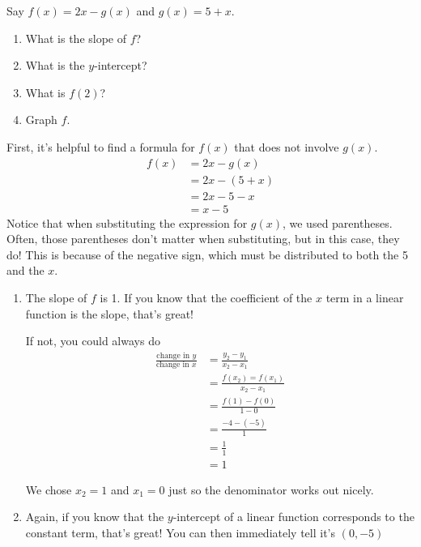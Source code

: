 \documentclass[noauthor]{ximera}
\begin{document}
\begin{problem}
Say \(f(x) = 2x - g(x)\) and \(g(x) = 5 + x\).

\begin{enumerate}
    \item What is the slope of \(f\)?
    \item What is the \(y\)-intercept?
    \item What is \(f(2)\)?
    \item Graph \(f\).
\end{enumerate}

\begin{explanation}
    First, it's helpful to find a formula for \(f(x)\) that does not involve \(g(x)\). 
    \begin{align*}
        f(x) & = 2x - g(x) \\
        & = 2x - (5 + x) \\
        & = 2x - 5 - x \\
        & = x - 5
    \end{align*}
    Notice that when substituting the expression for \(g(x)\), we used parentheses. Often, those parentheses don't matter when substituting, but 
    in this case, they do! This is because of the negative sign, which must be distributed to both the 5 and the \(x\). 
\begin{enumerate}
    \item The slope of \(f\) is 1. If you know that the coefficient of the \(x\) term in a linear function is the slope, that's great!
    
    If not, you could always do 
    \begin{align*}
        \frac{\text{change in }y}{\text{change in }x} & = \frac{y_2 - y_1}{x_2 - x_1} \\
        & = \frac{f(x_2) = f(x_1)}{x_2 - x_1} \\
        & = \frac{f(1) - f(0)}{1 - 0} \\
        & = \frac{-4 - (-5)}{1} \\
        & = \frac{1}{1} \\
        & = 1
    \end{align*}

    We chose \(x_2 = 1\) and \(x_1 = 0\) just so the denominator works out nicely.
    
    \item Again, if you know that the \(y\)-intercept of a linear function corresponds to the constant term, that's great! You can then immediately tell it's \((0, -5)\)
    

\end{enumerate}
\end{explanation}
\end{problem}
\end{document}
